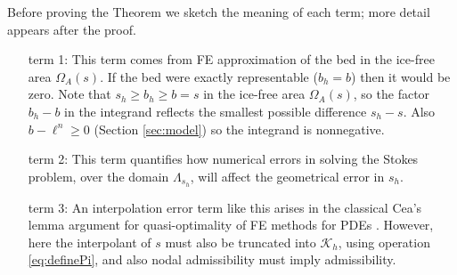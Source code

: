 \documentclass[hidelinks,onefignum,onetabnum,final]{siamart220329}  %
\newcommand{\cK}{\mathcal{K}}
\begin{document}
Before proving the Theorem we sketch the meaning of each term; more detail appears after the proof.

\medskip
\begin{itemize}
\item[term 1:]  This term comes from FE approximation of the bed in the ice-free area $\Omega_A(s)$.  If the bed were exactly representable ($b_h=b$) then it would be zero.  Note that $s_h \ge b_h \ge b = s$ in the ice-free area $\Omega_A(s)$, so the factor $b_h-b$ in the integrand reflects the smallest possible difference $s_h - s$.  Also $b-\ell^n\ge 0$ (Section \ref{sec:model}) so the integrand is nonnegative.

\item[term 2:]  This term quantifies how numerical errors in solving the Stokes problem, over the domain $\Lambda_{s_h}$, will affect the geometrical error in $s_h$.

\item[term 3:]  An interpolation error term like this arises in the classical Cea's lemma argument for quasi-optimality of FE methods for PDEs \cite{Ciarlet2002}.  However, here the interpolant of $s$ must also be truncated into $\cK_h$, using operation \eqref{eq:definePi}, and also nodal admissibility must imply admissibility.
\end{itemize}
\end{document}
